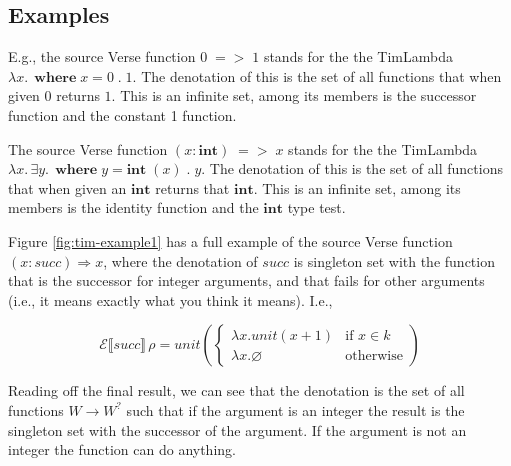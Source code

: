 \documentclass[acmsmall,review,dvipsnames]{acmart}
\newcommand{\Varid}[1]{\mathit{#1}}
\newcommand{\Value}{W}
\newcommand{\semfun}[1]{\mathcal{#1}}
\newcommand{\semapp}[3]{\semfun{#1}\llbracket #2 \rrbracket\, #3}
\newcommand{\mtyped}{\Value^{?}}
\newcommand{\munit}{\mathit{unit}}
\newcommand{\munits}[1]{\munit(#1)}
\begin{document}
\subsection{Examples}

E.g., the source Verse function \ensuremath{\mathrm{0}\;=>\;\mathrm{1}} stands for the the TimLambda \ensuremath{\lambda\Varid{x}.\,\;\mathbf{where}\;\Varid{x}\mathrel{=}\mathrm{0}\;\! .\;\mathrm{1}}.
The denotation of this is the set of all functions that when given \ensuremath{\mathrm{0}} returns \ensuremath{\mathrm{1}}.
This is an infinite set, among its members is the successor function and the constant 1 function.

The source Verse function \ensuremath{(\Varid{x}\mathbin{:}\textbf{int})\;=>\;\Varid{x}} stands for the the TimLambda \ensuremath{\lambda\Varid{x}.\,\exists\Varid{y}.\,\;\mathbf{where}\;\Varid{y}\mathrel{=}\textbf{int}\;(\Varid{x})\;\! .\;\Varid{y}}.
The denotation of this is the set of all functions that when given an \ensuremath{\textbf{int}} returns that \ensuremath{\textbf{int}}.
This is an infinite set, among its members is the identity function and the \ensuremath{\textbf{int}} type test.

Figure \ref{fig:tim-example1} has a full example of the source Verse function \ensuremath{(\Varid{x}\mathbin{:}\Varid{succ})\Rightarrow \Varid{x}},
where the denotation of \ensuremath{\Varid{succ}} is singleton
set with the function that is the successor for integer arguments, and that fails for other arguments
(i.e., it means exactly what you think it means).  I.e.,

$$
\semapp{E}{succ}{\rho} = \munits{\left\{ \begin{array}{ll}
  \lambda x . \munits{x+1} & \text{if $x \in k$ } \\
  \lambda x . \varnothing & \text{otherwise}
\end{array}
\right. }
$$

Reading off the final result, we can see that the denotation is the set of all functions $\Value \rightarrow \mtyped$
such that if the argument is an integer the result is the singleton set with the successor of the argument.
If the argument is not an integer the function can do anything.
\end{document}
